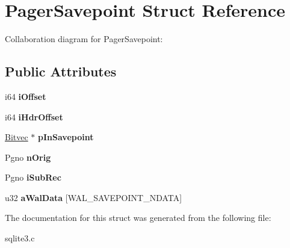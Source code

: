 \hypertarget{structPagerSavepoint}{}\section{Pager\+Savepoint Struct Reference}
\label{structPagerSavepoint}


Collaboration diagram for Pager\+Savepoint\+:
\subsection*{Public Attributes}
\begin{DoxyCompactItemize}
\item 
i64 {\bfseries i\+Offset}\hypertarget{structPagerSavepoint_ab3ee7b75a10f47a82c8e3312bee6ad60}{}\label{structPagerSavepoint_ab3ee7b75a10f47a82c8e3312bee6ad60}

\item 
i64 {\bfseries i\+Hdr\+Offset}\hypertarget{structPagerSavepoint_ae1afd1cf4fba6f7efd232656366121d1}{}\label{structPagerSavepoint_ae1afd1cf4fba6f7efd232656366121d1}

\item 
\hyperlink{structBitvec}{Bitvec} $\ast$ {\bfseries p\+In\+Savepoint}\hypertarget{structPagerSavepoint_abf7d6dc9d457c866727f84c4b9e0348f}{}\label{structPagerSavepoint_abf7d6dc9d457c866727f84c4b9e0348f}

\item 
Pgno {\bfseries n\+Orig}\hypertarget{structPagerSavepoint_a944cca2844a51bdba253476f516b9865}{}\label{structPagerSavepoint_a944cca2844a51bdba253476f516b9865}

\item 
Pgno {\bfseries i\+Sub\+Rec}\hypertarget{structPagerSavepoint_ac1accce313b9da31631892e2cbe85a2f}{}\label{structPagerSavepoint_ac1accce313b9da31631892e2cbe85a2f}

\item 
u32 {\bfseries a\+Wal\+Data} \mbox{[}W\+A\+L\+\_\+\+S\+A\+V\+E\+P\+O\+I\+N\+T\+\_\+\+N\+D\+A\+TA\mbox{]}\hypertarget{structPagerSavepoint_ac96cff844a24378c426a9901517f1d6c}{}\label{structPagerSavepoint_ac96cff844a24378c426a9901517f1d6c}

\end{DoxyCompactItemize}


The documentation for this struct was generated from the following file\+:\begin{DoxyCompactItemize}
\item 
sqlite3.\+c\end{DoxyCompactItemize}
